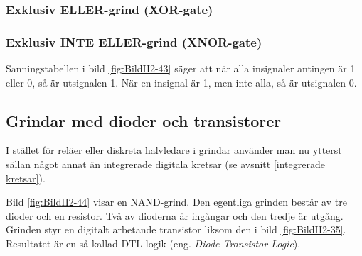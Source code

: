 
\subsubsection{Exklusiv ELLER-grind (XOR-gate)}


\subsubsection{Exklusiv INTE ELLER-grind (XNOR-gate)}


Sanningstabellen i bild \ref{fig:BildII2-43} säger att när alla
insignaler antingen är 1 eller 0, så är utsignalen 1. När en insignal
är 1, men inte alla, så är utsignalen 0.

\subsection{Grindar med dioder och transistorer}

I stället för reläer eller diskreta halvledare i grindar använder man nu ytterst sällan något annat än integrerade digitala kretsar (se avsnitt \ref{integrerade kretsar}).



Bild \ref{fig:BildII2-44} visar en NAND-grind.
Den egentliga grinden består av tre dioder och en resistor.
Två av dioderna är ingångar och den tredje är utgång.
Grinden styr en digitalt arbetande transistor liksom den i bild
\ref{fig:BildII2-35}.
Resultatet är en så kallad DTL-logik (eng. \emph{Diode-Transistor Logic}).

